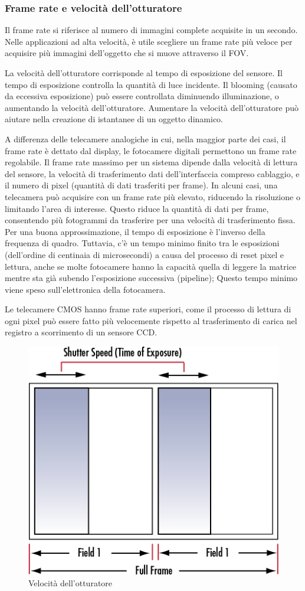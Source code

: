 \subsubsection{Frame rate e velocità dell'otturatore}
Il frame rate si riferisce al numero di immagini complete acquisite in un secondo.  Nelle applicazioni ad alta velocità, è utile scegliere un frame rate più veloce per acquisire più immagini dell'oggetto che si muove attraverso il FOV.

La velocità dell'otturatore corrisponde al tempo di esposizione del sensore. Il tempo di esposizione controlla la quantità di luce incidente. Il blooming (causato da eccessiva esposizione) può essere controllata diminuendo illuminazione, o aumentando la velocità dell'otturatore. Aumentare la velocità dell'otturatore può aiutare nella creazione di istantanee di un oggetto dinamico.

A differenza delle telecamere analogiche in cui, nella maggior parte dei casi, il frame rate è dettato dal display, le fotocamere digitali permettono un frame rate regolabile. Il frame rate massimo per un sistema dipende dalla velocità di lettura del sensore, la velocità di trasferimento dati dell'interfaccia compreso cablaggio, e il numero di pixel (quantità di dati trasferiti per frame). In alcuni casi, una telecamera può acquisire con un frame rate più elevato, riducendo la risoluzione o limitando l'area di interesse. Questo riduce la quantità di dati per frame, consentendo più fotogrammi da trasferire per una velocità di trasferimento fissa. Per una buona approssimazione, il tempo di esposizione è l'inverso della frequenza di quadro. Tuttavia, c'è un tempo minimo finito tra le esposizioni (dell'ordine di centinaia di microsecondi) a causa del processo di reset pixel e lettura, anche se molte fotocamere hanno la capacità quella di leggere la matrice mentre sta già subendo l'esposizione successiva (pipeline); 
Questo tempo minimo viene speso sull'elettronica della fotocamera.

Le telecamere CMOS hanno frame rate superiori, come il processo di lettura di ogni pixel può essere fatto più velocemente rispetto al trasferimento di carica nel registro a scorrimento di un sensore CCD.

\begin{figure}[!ht]
\centering
\includegraphics{img/shutter-speed.jpeg}
\caption{Velocità dell'otturatore}
\label{fig:shutter-speed}
\end{figure}

